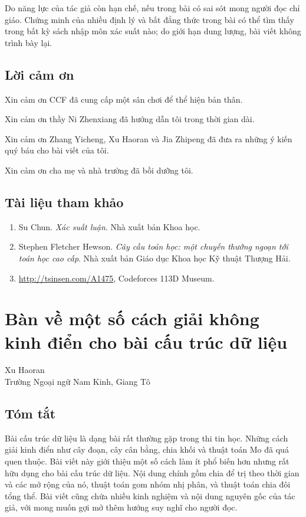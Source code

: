 \documentclass[11pt]{article}
\begin{document}
Do năng lực của tác giả còn hạn chế, nếu trong bài có sai sót mong người đọc
chỉ giáo. Chứng minh của nhiều định lý và bất đẳng thức trong bài có thể tìm
thấy trong bất kỳ sách nhập môn xác suất nào; do giới hạn dung lượng, bài
viết không trình bày lại.

\subsection{Lời cảm ơn}

Xin cảm ơn CCF đã cung cấp một sân chơi để thể hiện bản thân.

Xin cảm ơn thầy Ni Zhenxiang đã hướng dẫn tôi trong thời gian dài.

Xin cảm ơn Zhang Yicheng, Xu Haoran và Jia Zhipeng đã đưa ra những ý kiến
quý báu cho bài viết của tôi.

Xin cảm ơn cha mẹ và nhà trường đã bồi dưỡng tôi.

\subsection{Tài liệu tham khảo}

\begin{enumerate}
  \item Su Chun. \emph{Xác suất luận}. Nhà xuất bản Khoa học.
  \item Stephen Fletcher Hewson. \emph{Cây cầu toán học: một chuyến thưởng
  ngoạn tới toán học cao cấp}. Nhà xuất bản Giáo dục Khoa học Kỹ thuật
  Thượng Hải.
  \item \url{http://tsinsen.com/A1475}, Codeforces 113D Museum.
\end{enumerate}

\section{Bàn về một số cách giải không kinh điển cho bài cấu trúc dữ liệu}

\begin{center}
Xu Haoran\\
Trường Ngoại ngữ Nam Kinh, Giang Tô
\end{center}

\subsection*{Tóm tắt}

Bài cấu trúc dữ liệu là dạng bài rất thường gặp trong thi tin học. Những
cách giải kinh điển như cây đoạn, cây cân bằng, chia khối và thuật toán Mo
đã quá quen thuộc. Bài viết này giới thiệu một số cách làm ít phổ biến hơn
nhưng rất hữu dụng cho bài cấu trúc dữ liệu. Nội dung chính gồm chia để trị
theo thời gian và các mở rộng của nó, thuật toán gom nhóm nhị phân, và thuật
toán chia đôi tổng thể. Bài viết cũng chứa nhiều kinh nghiệm và nội dung
nguyên gốc của tác giả, với mong muốn gợi mở thêm hướng suy nghĩ cho người
đọc.
\end{document}

